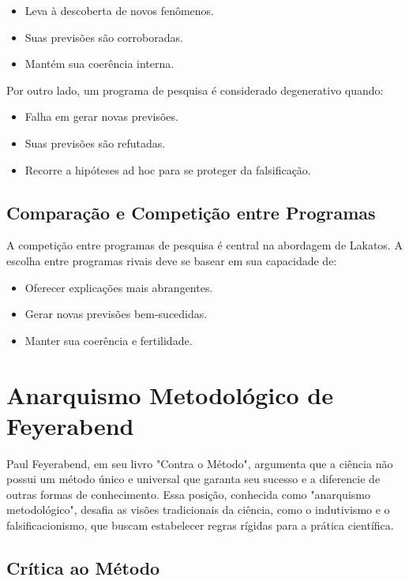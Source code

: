 \documentclass{article} %
\begin{document}
\begin{itemize}
    \item Leva à descoberta de novos fenômenos.
    \item Suas previsões são corroboradas.
    \item Mantém sua coerência interna.
\end{itemize}
Por outro lado, um programa de pesquisa é considerado degenerativo quando:

\begin{itemize}
    \item Falha em gerar novas previsões.
    \item Suas previsões são refutadas.
    \item Recorre a hipóteses ad hoc para se proteger da falsificação.
\end{itemize}

\subsection{Comparação e Competição entre Programas}

A competição entre programas de pesquisa é central na abordagem de Lakatos. A escolha entre programas rivais deve se basear em sua capacidade de:

\begin{itemize}
    \item Oferecer explicações mais abrangentes.
    \item Gerar novas previsões bem-sucedidas.
    \item Manter sua coerência e fertilidade.
\end{itemize}

\section{Anarquismo Metodológico de Feyerabend}

Paul Feyerabend, em seu livro "Contra o Método", argumenta que a ciência não possui um método único e universal que garanta seu sucesso e a diferencie de outras formas de conhecimento. Essa posição, conhecida como "anarquismo metodológico", desafia as visões tradicionais da ciência, como o indutivismo e o falsificacionismo, que buscam estabelecer regras rígidas para a prática científica.

\subsection{Crítica ao Método}
\end{document}
